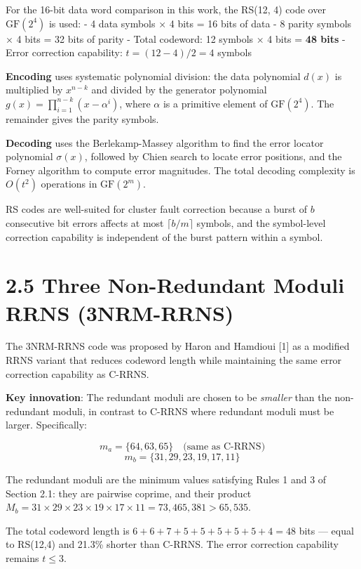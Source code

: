 \documentclass[
  12pt,
  a4paper]{report}
\begin{document}
For the 16-bit data word comparison in this work, the RS(12, 4) code
over \(\text{GF}(2^4)\) is used: - 4 data symbols × 4 bits = 16 bits of
data - 8 parity symbols × 4 bits = 32 bits of parity - Total codeword:
12 symbols × 4 bits = \textbf{48 bits} - Error correction capability:
\(t = (12-4)/2 = 4\) symbols

\textbf{Encoding} uses systematic polynomial division: the data
polynomial \(d(x)\) is multiplied by \(x^{n-k}\) and divided by the
generator polynomial \(g(x) = \prod_{i=1}^{n-k}(x - \alpha^i)\), where
\(\alpha\) is a primitive element of \(\text{GF}(2^4)\). The remainder
gives the parity symbols.

\textbf{Decoding} uses the Berlekamp-Massey algorithm to find the error
locator polynomial \(\sigma(x)\), followed by Chien search to locate
error positions, and the Forney algorithm to compute error magnitudes.
The total decoding complexity is \(O(t^2)\) operations in
\(\text{GF}(2^m)\).

RS codes are well-suited for cluster fault correction because a burst of
\(b\) consecutive bit errors affects at most \(\lceil b/m \rceil\)
symbols, and the symbol-level correction capability is independent of
the burst pattern within a symbol.

\section{2.5 Three Non-Redundant Moduli RRNS
(3NRM-RRNS)}\label{three-non-redundant-moduli-rrns-3nrm-rrns}

The 3NRM-RRNS code was proposed by Haron and Hamdioui {[}1{]} as a
modified RRNS variant that reduces codeword length while maintaining the
same error correction capability as C-RRNS.

\textbf{Key innovation}: The redundant moduli are chosen to be
\emph{smaller} than the non-redundant moduli, in contrast to C-RRNS
where redundant moduli must be larger. Specifically:

\[m_a = \{64, 63, 65\} \quad \text{(same as C-RRNS)}\]
\[m_b = \{31, 29, 23, 19, 17, 11\}\]

The redundant moduli are the minimum values satisfying Rules 1 and 3 of
Section 2.1: they are pairwise coprime, and their product
\(M_b = 31 \times 29 \times 23 \times 19 \times 17 \times 11 = 73{,}465{,}381 > 65{,}535\).

The total codeword length is \(6 + 6 + 7 + 5 + 5 + 5 + 5 + 5 + 4 = 48\)
bits --- equal to RS(12,4) and 21.3\% shorter than C-RRNS. The error
correction capability remains \(t \leq 3\).
\end{document}
